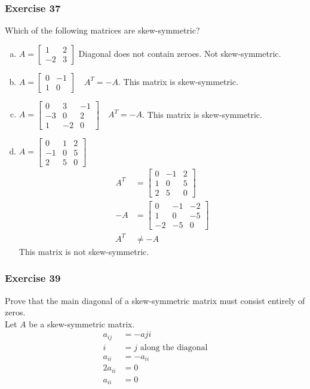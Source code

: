 \documentclass[letterpaper, 12pt]{math}
\begin{document}
\subsubsection*{Exercise 37}
Which of the following matrices are skew-symmetric?
\begin{enumerate}[(a)]
  \item \( A = \begin{bmatrix}1 & 2 \\ -2 & 3\end{bmatrix} \) Diagonal does not
  contain zeroes. Not skew-symmetric.
  \item \( A = \begin{bmatrix}0 & -1 \\ 1 & 0\end{bmatrix} \quad A^T = -A \).
  This matrix is skew-symmetric.
  \item \( A = \begin{bmatrix}0 & 3 & -1 \\ -3 & 0 & 2 \\ 1 & -2 & 0
  \end{bmatrix} \quad A^T = -A \). This matrix is skew-symmetric.
  \item \( A = \begin{bmatrix}0 & 1 & 2 \\ -1 & 0 & 5 \\ 2 & 5 & 0
  \end{bmatrix} \)
  \begin{align*}
    A^T &= \begin{bmatrix}
      0 & -1 & 2 \\
      1 & 0 & 5 \\
      2 & 5 & 0
    \end{bmatrix} \\
    -A &= \begin{bmatrix}
      0 & -1 & -2 \\
      1 & 0 & -5 \\
      -2 & -5 & 0
    \end{bmatrix} \\
    A^T &\ne -A
  \end{align*}
  This matrix is not skew-symmetric.
\end{enumerate}

\subsubsection*{Exercise 39}
Prove that the main diagonal of a skew-symmetric matrix must consist entirely
of zeros. \\
Let \( A \) be a skew-symmetric matrix.
\begin{align*}
  a_{ij} &= -a{ji} \\
  i &= j \text{ along the diagonal} \\
  a_{ii} &= -a_{ii} \\
  2a_{ii} &= 0 \\
  a_{ii} &= 0
\end{align*}
\end{document}
